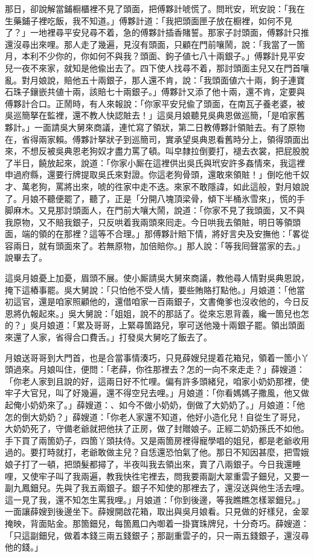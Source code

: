 那日，卻說解當鋪橱櫃裡不見了頭面，把傅夥計唬慌了。問玳安，玳安說：「我在生藥鋪子裡吃飯，我不知道。」傅夥計道：「我把頭面匣子放在橱裡，如何不見了？」一地裡尋平安兒尋不着，急的傅夥計插香賭誓。那家子討頭面，傅夥計只推還沒尋出來哩。那人走了幾遍，見沒有頭面，只顧在門前嚷鬧，說：「我當了一箇月，本利不少你的，你如何不與我？頭面、鉤子値七八十兩銀子。」傅夥計見平安兒一夜不來家，就知是他偸出去了。四下使人找尋不着，那討頭面主兒又在門首嚷亂。對月娘說，賠他五十兩銀子，那人還不肯，說：「我頭面値六十兩，鉤子連寶石珠子鑲嵌共値十兩，該賠七十兩銀子。」傅夥計又添了他十兩，還不肯，定要與傅夥計合口。正鬧時，有人來報說：「你家平安兒偸了頭面，在南瓦子養老婆，被吳巡簡拏在監裡，還不教人快認賍去！」這吳月娘聽見吳典恩做巡簡，「是咱家舊夥計。」一面請吳大舅來商議，連忙寫了領狀，第二日教傅夥計領賍去。有了原物在，省得兩家賴。傅夥計拏狀子到巡簡司，實承望吳典恩看舊時分上，領得頭面出來，不想反被吳典恩老狗奴才盡力罵了頓。叫皁隸拉倒要打，褪去衣裳，把屁股脫了半日，饒放起來，說道：「你家小厮在這裡供出吳氏與玳安許多姦情來，我這裡申過府縣，還要行牌提取吳氏來對證。你這老狗骨頭，還敢來領賍！」{}倒吃他千奴才、萬老狗，罵將出來，唬的徃家中走不迭。來家不敢隱諱，如此這般，對月娘說了。月娘不聽便罷了，聽了，正是「分開八塊頂梁骨，傾下半桶氷雪來」，慌的手脚麻木。又見那討頭面人，在門前大嚷大鬧，說道：「你家不見了我頭面，又不與我原物，又不賠我銀子，只反哄着我兩頭來囘走。今日哄我去領賍，明日等領頭面，端的領的在那裡？這等不合理。」那傅夥計賠下情，將好言央及安撫他：「畧從容兩日，就有頭面來了。若無原物，加倍賠你。」那人說：「等我囘聲當家的去。」說畢去了。

這吳月娘憂上加憂，眉頭不展。使小厮請吳大舅來商議，教他尋人情對吳典恩說，掩下這樁事罷。吳大舅說：「只怕他不受人情，要些賄賂打點他。」月娘道：「他當初這官，還是咱家照顧他的，還借咱家一百兩銀子，文書俺爹也沒收他的，今日反恩將仇報起來。」吳大舅說：「姐姐，說不的那話了。從來忘恩背義，纔一箇兒也怎的？」{}吳月娘道：「累及哥哥，上緊尋箇路兒，寧可送他幾十兩銀子罷。領出頭面來還了人家，省得合口費舌。」打發吳大舅吃了飯去了。

月娘送哥哥到大門首，也是合當事情湊巧，只見薛嫂兒提着花箱兒，領着一箇小丫頭過來。月娘叫住，便問：「老薛，你徃那裡去？怎的一向不來走走？」薛嫂道：「你老人家到且說的好，這兩日好不忙哩。偏有許多頭緒兒，咱家小奶奶那裡，使牢子大官兒，叫了好幾遍，還不得空兒去哩。」月娘道：「你看媽媽子撒風，他又做起俺小奶奶來了。」薛嫂道：、如今不做小奶奶，倒做了大奶奶了。」月娘道：「他怎的倒大奶奶？」薛嫂道：「你老人家還不知道，他好小造化兒！自從生了哥兒，大奶奶死了，守備老爺就把他扶了正房，做了封贈娘子。正經二奶奶孫氏不如他。手下買了兩箇奶子，四箇丫頭扶侍。又是兩箇房裡得寵學唱的姐兒，都是老爺收用過的。要打時就打，老爺敢做主兒？自恁還恐怕氣了他。那日不知因甚麼，把雪娥娘子打了一頓，把頭髮都撏了，半夜叫我去領出來，賣了八兩銀子。今日我還睡哩，又使牢子叫了我兩遍，教我快徃宅裡去，問我要兩副大翠重雲子鈿兒，又要一副九鳳鈿兒。先與了我五兩銀子。銀子不知使的那裡去了，還沒送與他生活去哩。這一見了我，還不知怎生罵我哩。」月娘道：「你到後邊，等我瞧瞧怎樣翠鈿兒。」一面讓薛嫂到後邊坐下。薛嫂開啟花箱，取出與吳月娘看。只見做的好樣兒，金翠掩映，背面貼金。那箇鈿兒，每箇鳳口內啣着一掛寶珠牌兒，十分奇巧。薛嫂道：「只這副鈿兒，做着本錢三兩五錢銀子；那副重雲子的，只一兩五錢銀子，還沒尋他的錢。」

